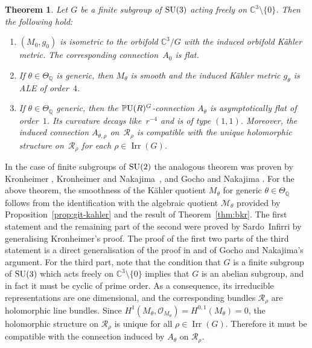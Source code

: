 \documentclass[10pt,a4paper]{amsart}
\numberwithin{equation}{section}
\newcommand{\cO}{\mathcal{O}}
\newcommand{\cR}{\mathcal{R}}
\newcommand{\sM}{\mathscr{M}}
\newcommand{\Q}{{\mathbb Q}}
\newcommand{\C}{{\mathbb C}}
\newcommand{\SU}{{\rm SU}}
\newcommand{\PU}{{\mathbb P}{\rm U}}
\newcommand{\Irr}{\operatorname{Irr}}
\newtheorem{Theorem}{Theorem}[section]
\begin{document}
\begin{Theorem}\label{thm:asympt}
  Let $G$ be a finite subgroup of $\SU(3)$ acting freely on
  $\C^3{\setminus} \{0\}$.  Then the following hold:
  \begin{enumerate}\itemsep=0pt
  \item[$(1)$] $(M_0,g_0)$ is isometric to the orbifold $\C^3/G$ with the
    induced orbifold K\"ahler metric. The corresponding connection~$A_0$
    is flat.
  \item[$(2)$] %
   If $\theta \in \Theta_\Q$ is generic,
    then $M_{\theta}$ is smooth and the induced K\"ahler metric
    $g_{\theta}$ is ALE of order~$4$.
  \item[$(3)$] %
  If $\theta\in \Theta_\Q$ generic, then
    the $\PU(R)^G$-connection $A_{\theta}$ is asymptotically flat of
    order~$1$.  Its curvature decays like~$r^{-4}$ and is of type
    $(1,1)$.  Moreover, the induced connection $A_{\theta,\rho}$ on~$\cR_\rho$ is compatible with the unique holomorphic structure on~$\cR_\rho$ for each $\rho \in \Irr(G)$.
  \end{enumerate}
\end{Theorem}

In the case of f\/inite subgroups of $\SU(2)$ the analogous theorem was proven by Kronheimer \cite{Kronheimer1989}, Kronheimer and Nakajima~\cite{Kronheimer1990}, and Gocho and Nakajima \cite{Gocho1992}.
For the above theorem, the smoothness of the K\"ahler quotient $M_{\theta}$ for generic $\theta\in \Theta_{\Q}$ follows from the identif\/ication with the algebraic quotient $\sM_{\theta}$ provided by Proposition~\ref{prop:git-kahler} and the result of Theorem~\ref{thm:bkr}.
The f\/irst statement and the remaining part of the second were proved by Sardo~Inf\/irri \cite{SardoInfirri1996} by generalising Kronheimer's proof.
The proof of the f\/irst two parts of the third statement is a direct generalisation of the proof in \cite[Proposition~2.2]{Kronheimer1990} and of Gocho and Nakajima's argument.
For the third part, note that the condition that $G$ is a f\/inite subgroup of $\SU(3)$ which acts freely on $\C^3{\setminus} \{0\}$ implies that $G$ is an abelian subgroup, and in fact it must be cyclic of prime order.
As a consequence, its irreducible representations are one dimensional, and the corresponding bundles $\cR_{\rho}$ are holomorphic line bundles.
Since $H^1(M_\theta,\cO_{M_\theta})=H^{0,1}(M_\theta)=0$, the holomorphic structure on $\cR_\rho$ is unique for all $\rho \in \Irr(G)$.
Therefore it must be compatible with the connection induced by $A_{\theta}$ on $\cR_{\rho}$.
\end{document}
